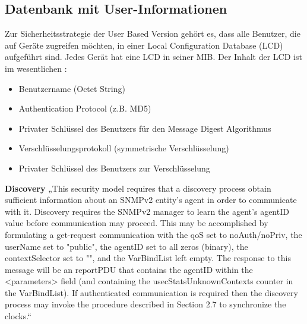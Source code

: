 \documentclass[11pt,a4paper]{article}
\begin{document}
\subsection{Datenbank mit User-Informationen}
Zur Sicherheitsstrategie der User Based Version gehört es, dass alle Benutzer, die auf Geräte zugreifen möchten, in einer Local Configuration Database (LCD) aufgeführt sind. Jedes Gerät hat eine LCD in seiner MIB.
Der Inhalt der LCD ist im wesentlichen :\\
\begin{itemize}
	\item{Benutzername (Octet String)}
	\item{Authentication Protocol (z.B. MD5)}
	\item{Privater Schlüssel des Benutzers für den Message Digest Algorithmus}
	\item{Verschlüsselungsprotokoll (symmetrische Verschlüsselung)}
	\item{Privater Schlüssel des Benutzers zur Verschlüsselung}
\end{itemize}
\textbf{Discovery}
„This security model requires that a discovery process obtain sufficient information about an SNMPv2 entity's agent in order to communicate with it.  Discovery requires the SNMPv2 manager to learn the agent's agentID value before communication may proceed. This may be accomplished by formulating a get-request communication with the qoS set to noAuth/noPriv, the userName set to "public", the agentID set to all zeros (binary), the contextSelector set to "", and the VarBindList left empty.  The response to this message will be an reportPDU that contains the agentID within the <parameters> field (and containing the usecStatsUnknownContexts counter in the VarBindList). If authenticated communication is required then the discovery process may invoke the procedure described in Section 2.7 to synchronize the clocks.“
\cite{rfcDiscoveryAgent}
\end{document}
